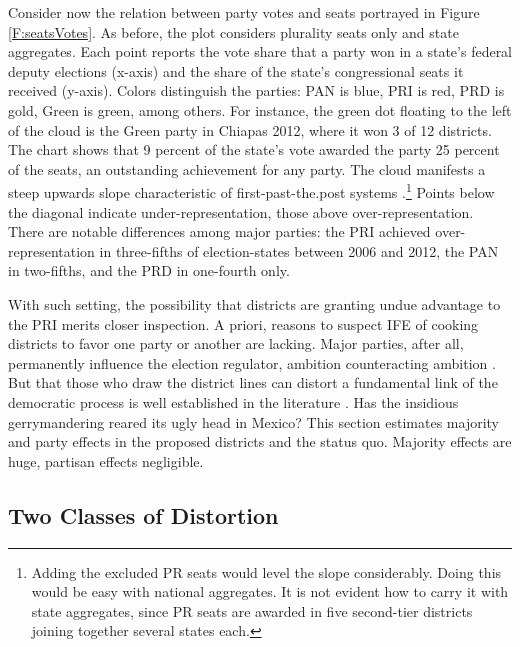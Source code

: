 \documentclass[letter,12pt]{article}
\begin{document}
Consider now the relation between party votes and seats portrayed in Figure \ref{F:seatsVotes}. As before, the plot considers plurality seats only and state aggregates. Each point reports the vote share that a party won in a state's federal deputy elections (x-axis) and the share of the state's congressional seats it received (y-axis). Colors distinguish the parties: PAN is blue, PRI is red, PRD is gold, Green is green, among others. For instance, the green dot floating to the left of the cloud is the Green party in Chiapas 2012, where it won 3 of 12 districts. The chart shows that 9 percent of the state's vote awarded the party 25 percent of the seats, an outstanding achievement for any party. The cloud manifests a steep upwards slope characteristic of first-past-the.post systems \citep{taagepera.CubeLaw.1973}.\footnote{Adding the excluded PR seats would level the slope considerably. Doing this would be easy with national aggregates. It is not evident how to carry it with state aggregates, since PR seats are awarded in five second-tier districts joining together several states each.} Points below the diagonal indicate under-representation, those above over-representation. There are notable differences among major parties: the PRI achieved over-representation in three-fifths of election-states between 2006 and 2012, the PAN in two-fifths, and the PRD in one-fourth only. 

With such setting, the possibility that districts are granting undue advantage to the PRI merits closer inspection. A priori, reasons to suspect IFE of cooking districts to favor one party or another are lacking. Major parties, after all, permanently influence the election regulator, ambition counteracting ambition \citep{estevez.magar.rosas.2008}. But that those who draw the district lines can distort a fundamental link of the democratic process is well established in the literature \citep{altman.mcdonald2011bard,cox.katz.2002,engstrom2006redisttrictApsr,rossiter.etal.1997,king.1990elRespBiasMultiparty,balinskiYoung2001FairRep,otero.2003}. Has the insidious gerrymandering reared its ugly head in Mexico? This section estimates majority and party effects in the proposed districts and the status quo. Majority effects are huge, partisan effects negligible. 

\subsection{Two Classes of Distortion}
\end{document}
